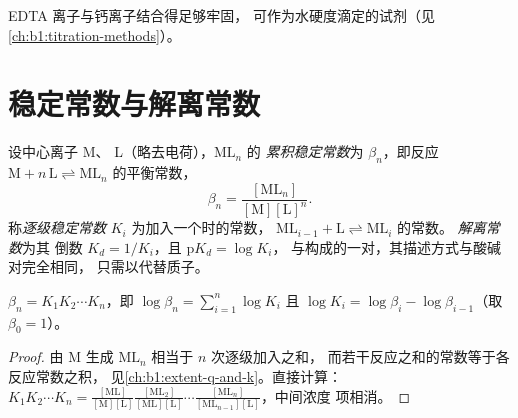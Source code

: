 EDTA 离子与钙离子结合得足够牢固，
可作为水硬度滴定的试剂（见\cref{ch:b1:titration-methods}）。

\section{稳定常数与解离常数}

\begin{definition}[稳定常数与解离常数]\label{def:b1:complexation:formation-constant}
设中心离子 M、 L（略去电荷），$\mathrm{ML}_n$ 的
\emph{累积稳定常数}为
$\beta_n$，即反应
$\mathrm{M} + n\,\mathrm{L} \rightleftharpoons \mathrm{ML}_n$ 的平衡常数，
\[
  \beta_n = \frac{[\mathrm{ML}_n]}{[\mathrm{M}][\mathrm{L}]^n} .
\]
称\emph{逐级稳定常数}
$K_i$ 为加入一个时的常数，
$\mathrm{ML}_{i-1} + \mathrm{L} \rightleftharpoons \mathrm{ML}_i$ 的常数。
\emph{解离常数}为其
倒数 $K_d = 1/K_i$，且 $\mathrm{p}K_d = \log K_i$，
与构成的一对，其描述方式与酸碱对完全相同，
只需以代替质子。
\end{definition}

\begin{proposition}[累积稳定常数与逐级稳定常数]\label{prop:b1:complexation:beta-k}
$\beta_n = K_1 K_2 \cdots K_n$，即
$\log\beta_n = \sum_{i=1}^n \log K_i$ 且 $\log K_i = \log\beta_i -
\log\beta_{i-1}$（取 $\beta_0 = 1$）。
\end{proposition}

\begin{proof}
由 M 生成 $\mathrm{ML}_n$ 相当于 $n$ 次逐级加入之和，
而若干反应之和的常数等于各反应常数之积，
见\cref{ch:b1:extent-q-and-k}。直接计算：
$K_1 K_2\cdots K_n = \frac{[\mathrm{ML}]}{[\mathrm{M}][\mathrm{L}]}
\frac{[\mathrm{ML_2}]}{[\mathrm{ML}][\mathrm{L}]}\cdots
\frac{[\mathrm{ML}_n]}{[\mathrm{ML}_{n-1}][\mathrm{L}]}$，中间浓度
项相消。
\end{proof}

